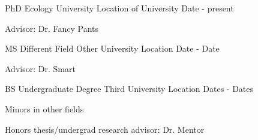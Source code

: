 

\begin{cventries}

  \cventry
    {PhD Ecology} %
    {University} %
    {Location of University} %
    {Date - present} %
    {
      \begin{cvitems} %
        \item {Advisor: Dr. Fancy Pants}
      \end{cvitems}
    }

  \cventry
    {MS Different Field} %
    {Other University} %
    {Location} %
    {Date - Date} %
    {
      \begin{cvitems} %
        \item {Advisor: Dr. Smart}
      \end{cvitems}
    }

  \cventry
    {BS Undergraduate Degree} %
    {Third University} %
    {Location} %
    {Dates - Dates} %
    {
      \begin{cvitems} %
        \item {Minors in other fields}
        \item {Honors thesis/undergrad research advisor: Dr. Mentor}
      \end{cvitems}
    }

\end{cventries}
